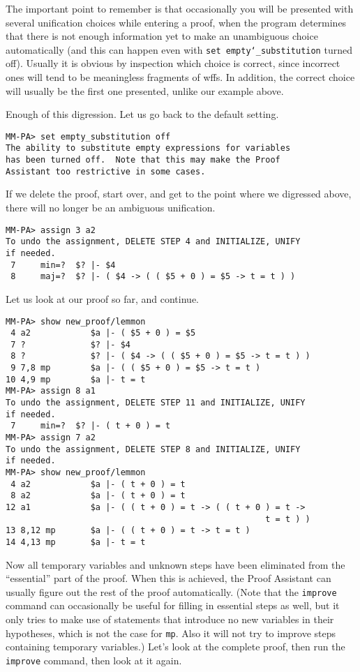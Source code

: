 The important point to remember is that occasionally you will be
presented with several unification choices while entering a proof, when
the program determines that there is not enough information yet to make
an unambiguous choice automatically (and this can happen even with
\texttt{set empty{\char`\_}substitution} turned off).  Usually it is
obvious by inspection which choice is correct, since incorrect ones will
tend to be meaningless fragments of wffs.  In addition, the correct
choice will usually be the first one presented, unlike our example
above.

Enough of this digression.  Let us go back to the default setting.

\begin{verbatim}
MM-PA> set empty_substitution off
The ability to substitute empty expressions for variables
has been turned off.  Note that this may make the Proof
Assistant too restrictive in some cases.
\end{verbatim}

If we delete the proof, start over, and get to the point where
we digressed above, there will no longer be an ambiguous unification.

\begin{verbatim}
MM-PA> assign 3 a2
To undo the assignment, DELETE STEP 4 and INITIALIZE, UNIFY
if needed.
 7     min=?  $? |- $4
 8     maj=?  $? |- ( $4 -> ( ( $5 + 0 ) = $5 -> t = t ) )
\end{verbatim}

Let us look at our proof so far, and continue.

\begin{verbatim}
MM-PA> show new_proof/lemmon
 4 a2            $a |- ( $5 + 0 ) = $5
 7 ?             $? |- $4
 8 ?             $? |- ( $4 -> ( ( $5 + 0 ) = $5 -> t = t ) )
 9 7,8 mp        $a |- ( ( $5 + 0 ) = $5 -> t = t )
10 4,9 mp        $a |- t = t
MM-PA> assign 8 a1
To undo the assignment, DELETE STEP 11 and INITIALIZE, UNIFY
if needed.
 7     min=?  $? |- ( t + 0 ) = t
MM-PA> assign 7 a2
To undo the assignment, DELETE STEP 8 and INITIALIZE, UNIFY
if needed.
MM-PA> show new_proof/lemmon
 4 a2            $a |- ( t + 0 ) = t
 8 a2            $a |- ( t + 0 ) = t
12 a1            $a |- ( ( t + 0 ) = t -> ( ( t + 0 ) = t ->
                                                    t = t ) )
13 8,12 mp       $a |- ( ( t + 0 ) = t -> t = t )
14 4,13 mp       $a |- t = t
\end{verbatim}

Now all temporary variables and unknown steps have been eliminated from the
``essential'' part of the proof.  When this is achieved, the Proof
Assistant can usually figure out the rest of the proof
automatically.  (Note that the \texttt{improve} command can occasionally be
useful for filling in essential steps as well, but it only tries to make use
of statements that introduce no new variables in their hypotheses, which is
not the case for \texttt{mp}. Also it will not try to improve steps containing
temporary variables.)  Let's look at the complete proof, then run
the \texttt{improve} command, then look at it again.

